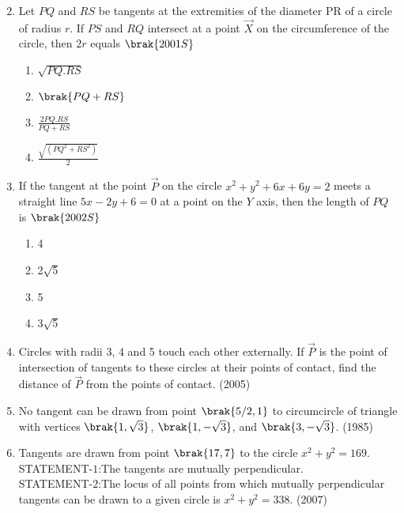 \begin{enumerate}
\begin{multicols}{2}
\end{multicols}
        \item Let $PQ$ and $RS$ be tangents at the extremities of the diameter PR of a circle of radius $r$. If $PS$ and $RQ$ intersect at a point $\vec{X}$ on the circumference of the circle,  then $2r$ equals
        \hfill$\brak{2001S}$
\begin{multicols}{4}
\begin{enumerate}
    \item $\sqrt{PQ.RS}$
     \item $\brak{PQ+RS}$
     \item $\frac{2PQ.RS}{PQ+RS}$
     \item $\frac{\sqrt{(PQ^2+RS^2)}}{2}$
     \end{enumerate}
\end{multicols}
     \item If the tangent at the point $\vec{P}$ on the circle $x^2+y^2+6x+6y=2$ meets a straight line $5x-2y+6=0$ at a point on the $Y$ axis,  then the length of $PQ$ is 
             \hfill$\brak{2002S}$
             \begin{multicols}{4}
\begin{enumerate}
             \item 4
             \item 2$\sqrt5$
             \item 5
             \item 3$\sqrt5$
\end{enumerate}
\end{multicols}
\item Circles with radii 3, 4 and 5 touch each other externally. If $\vec{P}$ is the point of intersection of tangents to these circles at their points of contact,  find the distance of $\vec{P}$ from the points of contact.
	           \hfill(2005) 
    \item No tangent can be drawn from point $\brak{5/2,  1}$ to circumcircle of triangle with vertices $\brak{1,  \sqrt{3}}$,  $\brak{1,  -\sqrt{3}}$,  and $\brak{3,  -\sqrt{3}}$.
    \hfill{(1985)}
\item Tangents are drawn from point $\brak{17,  7}$ to the circle $x^2+y^2=169$.\\
STATEMENT-$1$:The tangents are mutually perpendicular.\\
STATEMENT-$2$:The locus of all points from which mutually perpendicular tangents can be drawn to a given circle is $x^2+y^2=338$. \hfill(2007)
\begin{enumerate}

\end{enumerate}
\end{enumerate}
